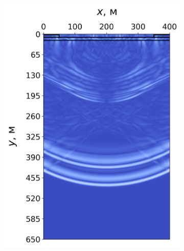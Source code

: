 \begin{figure}[H]
    \centering
    \begin{subfigure}{0.49\textwidth}
        \centering
        \includegraphics[width=\textwidth]{images/gas_field/004000.png}
    \end{subfigure}
    \hfill
    \begin{subfigure}{0.49\textwidth}
        \centering

\end{subfigure}
\end{figure}

